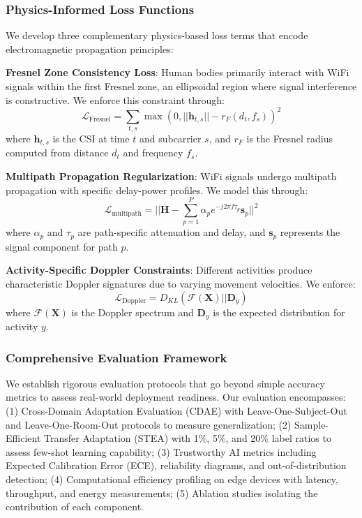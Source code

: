 \documentclass[10pt,journal,compsoc]{IEEEtran}
\begin{document}
\subsubsection{Physics-Informed Loss Functions}
We develop three complementary physics-based loss terms that encode electromagnetic propagation principles:

\textbf{Fresnel Zone Consistency Loss}: Human bodies primarily interact with WiFi signals within the first Fresnel zone, an ellipsoidal region where signal interference is constructive. We enforce this constraint through:
\begin{equation}
\mathcal{L}_{\text{Fresnel}} = \sum_{t,s} \max(0, ||\mathbf{h}_{t,s}|| - r_F(d_t, f_s))^2
\end{equation}
where $\mathbf{h}_{t,s}$ is the CSI at time $t$ and subcarrier $s$, and $r_F$ is the Fresnel radius computed from distance $d_t$ and frequency $f_s$.

\textbf{Multipath Propagation Regularization}: WiFi signals undergo multipath propagation with specific delay-power profiles. We model this through:
\begin{equation}
\mathcal{L}_{\text{multipath}} = ||\mathbf{H} - \sum_{p=1}^P \alpha_p e^{-j2\pi f \tau_p} \mathbf{s}_p||^2
\end{equation}
where $\alpha_p$ and $\tau_p$ are path-specific attenuation and delay, and $\mathbf{s}_p$ represents the signal component for path $p$.

\textbf{Activity-Specific Doppler Constraints}: Different activities produce characteristic Doppler signatures due to varying movement velocities. We enforce:
\begin{equation}
\mathcal{L}_{\text{Doppler}} = D_{KL}(\mathcal{F}(\mathbf{X}) || \mathbf{D}_y)
\end{equation}
where $\mathcal{F}(\mathbf{X})$ is the Doppler spectrum and $\mathbf{D}_y$ is the expected distribution for activity $y$.

\subsubsection{Comprehensive Evaluation Framework}
We establish rigorous evaluation protocols that go beyond simple accuracy metrics to assess real-world deployment readiness. Our evaluation encompasses: (1) Cross-Domain Adaptation Evaluation (CDAE) with Leave-One-Subject-Out and Leave-One-Room-Out protocols to measure generalization; (2) Sample-Efficient Transfer Adaptation (STEA) with 1\%, 5\%, and 20\% label ratios to assess few-shot learning capability; (3) Trustworthy AI metrics including Expected Calibration Error (ECE), reliability diagrams, and out-of-distribution detection; (4) Computational efficiency profiling on edge devices with latency, throughput, and energy measurements; (5) Ablation studies isolating the contribution of each component.
\end{document}
